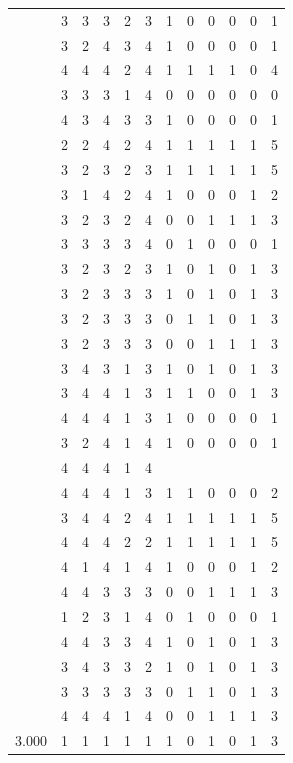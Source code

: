 \documentclass[]{book}
\theoremstyle{definition}
\theoremstyle{definition}
\theoremstyle{definition}
\theoremstyle{remark}
\begin{document}
\begin{table}
{\begin{tabular}[t]{rrrrrrrrrrrr}
 & 3 & 3 & 3 & 2 & 3 & 1 & 0 & 0 & 0 & 0 & 1\\
 & 3 & 2 & 4 & 3 & 4 & 1 & 0 & 0 & 0 & 0 & 1\\
 & 4 & 4 & 4 & 2 & 4 & 1 & 1 & 1 & 1 & 0 & 4\\
 & 3 & 3 & 3 & 1 & 4 & 0 & 0 & 0 & 0 & 0 & 0\\
 & 4 & 3 & 4 & 3 & 3 & 1 & 0 & 0 & 0 & 0 & 1\\
 & 2 & 2 & 4 & 2 & 4 & 1 & 1 & 1 & 1 & 1 & 5\\
 & 3 & 2 & 3 & 2 & 3 & 1 & 1 & 1 & 1 & 1 & 5\\
 & 3 & 1 & 4 & 2 & 4 & 1 & 0 & 0 & 0 & 1 & 2\\
 & 3 & 2 & 3 & 2 & 4 & 0 & 0 & 1 & 1 & 1 & 3\\
 & 3 & 3 & 3 & 3 & 4 & 0 & 1 & 0 & 0 & 0 & 1\\
 & 3 & 2 & 3 & 2 & 3 & 1 & 0 & 1 & 0 & 1 & 3\\
 & 3 & 2 & 3 & 3 & 3 & 1 & 0 & 1 & 0 & 1 & 3\\
 & 3 & 2 & 3 & 3 & 3 & 0 & 1 & 1 & 0 & 1 & 3\\
 & 3 & 2 & 3 & 3 & 3 & 0 & 0 & 1 & 1 & 1 & 3\\
 & 3 & 4 & 3 & 1 & 3 & 1 & 0 & 1 & 0 & 1 & 3\\
 & 3 & 4 & 4 & 1 & 3 & 1 & 1 & 0 & 0 & 1 & 3\\
 & 4 & 4 & 4 & 1 & 3 & 1 & 0 & 0 & 0 & 0 & 1\\
 & 3 & 2 & 4 & 1 & 4 & 1 & 0 & 0 & 0 & 0 & 1\\
 & 4 & 4 & 4 & 1 & 4 &  &  &  &  &  & \\
 & 4 & 4 & 4 & 1 & 3 & 1 & 1 & 0 & 0 & 0 & 2\\
 & 3 & 4 & 4 & 2 & 4 & 1 & 1 & 1 & 1 & 1 & 5\\
 & 4 & 4 & 4 & 2 & 2 & 1 & 1 & 1 & 1 & 1 & 5\\
 & 4 & 1 & 4 & 1 & 4 & 1 & 0 & 0 & 0 & 1 & 2\\
 & 4 & 4 & 3 & 3 & 3 & 0 & 0 & 1 & 1 & 1 & 3\\
 & 1 & 2 & 3 & 1 & 4 & 0 & 1 & 0 & 0 & 0 & 1\\
 & 4 & 4 & 3 & 3 & 4 & 1 & 0 & 1 & 0 & 1 & 3\\
 & 3 & 4 & 3 & 3 & 2 & 1 & 0 & 1 & 0 & 1 & 3\\
 & 3 & 3 & 3 & 3 & 3 & 0 & 1 & 1 & 0 & 1 & 3\\
 & 4 & 4 & 4 & 1 & 4 & 0 & 0 & 1 & 1 & 1 & 3\\
3.000 & 1 & 1 & 1 & 1 & 1 & 1 & 0 & 1 & 0 & 1 & 3\\

\end{tabular}}
\end{table}
\end{document}
